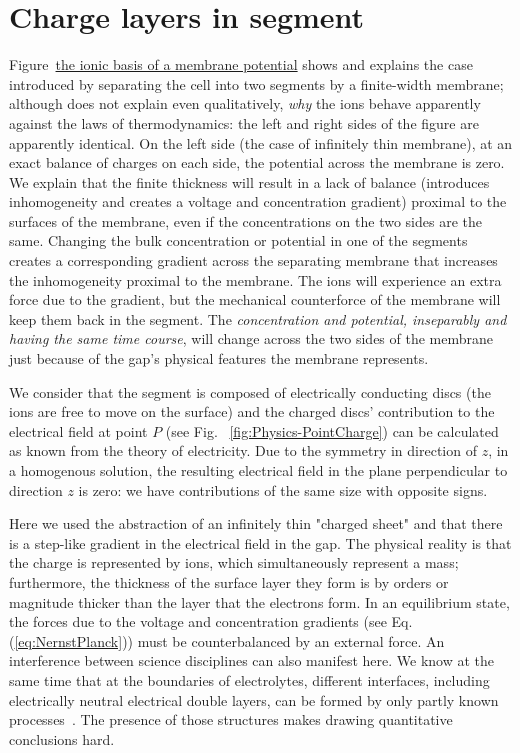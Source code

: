 \section[Charge layers]{Charge layers in segment\label{sec:Physics-LayersInSegment}}

Figure~\href{https://www.ncbi.nlm.nih.gov/books/NBK26910/figure/A2034/?report=objectonly}
{the ionic basis of a membrane potential} shows and explains the case
introduced by separating the cell into two segments by a  finite-width membrane; although does not explain even qualitatively, \textit{why} the ions behave apparently against the laws of thermodynamics: the left and right sides of the figure are apparently identical. On the left side (the case of infinitely thin membrane), 
at an exact balance of charges on each side, the potential across the membrane is zero. 
We explain that the finite thickness will result in
a lack of balance (introduces inhomogeneity and creates a voltage and concentration gradient) proximal to the surfaces of the membrane, even if the concentrations on the two sides are the same. Changing the
bulk concentration or potential in one of the segments creates a corresponding
gradient across the separating membrane that increases the inhomogeneity proximal to the membrane.
The ions will experience an extra force due to the gradient,
but the mechanical counterforce of the membrane will keep them back in the segment. The \emph{concentration and
	potential, inseparably and having the same time course}, will change
across the two sides of the membrane just because of the gap's physical
features the membrane represents. 

We consider that the segment is composed of electrically conducting discs (the ions are free to move on the surface) and the charged discs' contribution to the 
electrical field at point $P$ (see Fig.~ \ref{fig:Physics-PointCharge}) can be calculated as known from the 
theory of electricity. Due to the symmetry in direction of $z$, in a homogenous solution, the resulting electrical field in the plane perpendicular to direction $z$ is zero: we have  contributions of the same size with opposite signs. 

Here we used the abstraction of an infinitely thin "charged sheet" and that there is a step-like
gradient in the electrical field in the gap. The physical reality is that the charge is represented by ions, which simultaneously represent a mass; furthermore, the thickness of the surface layer they form is by orders or magnitude thicker than the layer that the electrons form. In an equilibrium state, the forces due to the voltage and concentration gradients (see Eq.(\ref{eq:NernstPlanck})) must be counterbalanced by an external force.
%
An interference between science disciplines can also manifest here. We know at the same time that at the boundaries of electrolytes, different interfaces, including electrically neutral electrical double layers, can be formed by only partly known 
processes~\cite{ElectricDoubleLayer:2023}. The presence of those structures makes drawing quantitative conclusions hard.


